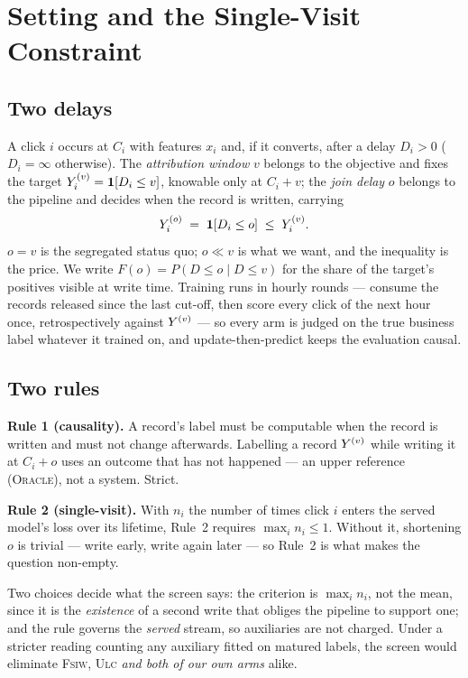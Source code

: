 \section{Setting and the Single-Visit Constraint}
\label{sec:setting}

\subsection{Two delays}

A click $i$ occurs at $C_i$ with features $x_i$ and, if it converts, after a delay $D_i>0$
($D_i=\infty$ otherwise). The \emph{attribution window} $v$ belongs to the objective and fixes
the target $Y^{(v)}_i=\mathbf{1}[D_i\le v]$, knowable only at $C_i+v$; the \emph{join delay} $o$
belongs to the pipeline and decides when the record is written, carrying
\begin{equation}
  Y^{(o)}_i \;=\; \mathbf{1}\!\left[D_i \le o\right] \;\le\; Y^{(v)}_i .
  \label{eq:labels}
\end{equation}
$o=v$ is the segregated status quo; $o\ll v$ is what we want, and the inequality is the price.
We write $F(o)=P(D\le o\mid D\le v)$ for the share of the target's positives visible at write
time. Training runs in hourly rounds --- consume the records released since the last cut-off,
then score every click of the next hour once, retrospectively against $Y^{(v)}$ --- so every arm is
judged on the true business label whatever it trained on, and update-then-predict keeps the
evaluation causal.

\subsection{Two rules}

\textbf{Rule 1 (causality).} A record's label must be computable when the record is written and
must not change afterwards. Labelling a record $Y^{(v)}$ while writing it at $C_i+o$ uses an outcome
that has not happened --- an upper reference (\textsc{Oracle}), not a system. Strict.

\textbf{Rule 2 (single-visit).} With $n_i$ the number of times click $i$ enters the served
model's loss over its lifetime, Rule~2 requires $\max_i n_i\le 1$. Without it, shortening $o$
is trivial --- write early, write again later --- so Rule~2 is what makes the question
non-empty.

Two choices decide what the screen says: the criterion is $\max_i n_i$, not the mean, since
it is the \emph{existence} of a second write that obliges the pipeline to support one; and the
rule governs the \emph{served} stream, so auxiliaries are not charged. Under a stricter reading
counting any auxiliary fitted on matured labels, the screen would eliminate \textsc{Fsiw},
\textsc{Ulc} \emph{and both of our own arms} alike.

